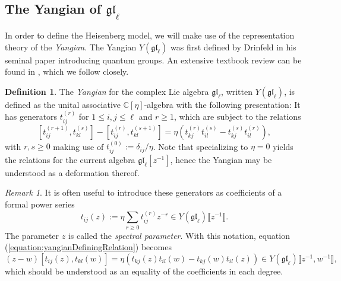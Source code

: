 \documentclass[11pt]{report}
\theoremstyle{definition}
\newtheorem{definition}[theorem]{Definition}
\theoremstyle{remark}
\newtheorem*{remark}{Remark}
\theoremstyle{remark}
\newcommand{\C}{\mathbb{C}}
\begin{document}
\subsection{The Yangian of $\mathfrak{gl}_\ell$}

In order to define the Heisenberg model, we will make use of the representation theory of the \emph{Yangian}. The Yangian $Y(\mathfrak{gl}_\ell)$ was first defined by Drinfeld in his seminal paper \cite{article:drinfeld:1985} introducing quantum groups. An extensive textbook review can be found in \cite{book:molev}, which we follow closely.

\begin{definition}
The \emph{Yangian} for the complex Lie algebra $\mathfrak{gl}_\ell$, written $Y(\mathfrak{gl}_\ell)$, is defined as the unital associative $\C[\eta]$-algebra with the following presentation: It has generators $t_{ij}^{(r)}$ for $1 \leq i,j \leq \ell$ and $r \geq 1$, which are subject to the relations
\begin{equation}\label{equation:yangianDefiningRelation}
[t_{ij}^{(r+1)},t_{kl}^{(s)}] - [t_{ij}^{(r)},t_{kl}^{(s+1)}] = \eta(t_{kj}^{(r)} t_{il}^{(s)} - t_{kj}^{(s)} t_{il}^{(r)}),
\end{equation}
with $r,s \geq 0$ making use of $t_{ij}^{(0)} := \delta_{ij}/\eta$. Note that specializing to $\eta = 0$ yields the relations for the current algebra $\mathfrak{gl}_\ell[z^{-1}]$, hence the Yangian may be understood as a deformation thereof.
\end{definition}

\begin{remark}
It is often useful to introduce these generators as coefficients of a formal power series
\begin{equation*}
t_{ij}(z) := \eta \sum_{r \geq 0} t_{ij}^{(r)} z^{-r} \in Y(\mathfrak{gl}_\ell)\llbracket z^{-1} \rrbracket.
\end{equation*}
The parameter $z$ is called the \emph{spectral parameter}. With this notation, equation (\ref{equation:yangianDefiningRelation}) becomes
\begin{equation}\label{equation:yangianDefiningRelationUV}
(z-w) [t_{ij}(z),t_{kl}(w)] = \eta(t_{kj}(z) t_{il}(w) - t_{kj}(w) t_{il}(z)) \in Y(\mathfrak{gl}_\ell)\llbracket z^{-1},w^{-1} \rrbracket,
\end{equation}
which should be understood as an equality of the coefficients in each degree.
\end{remark}
\end{document}
